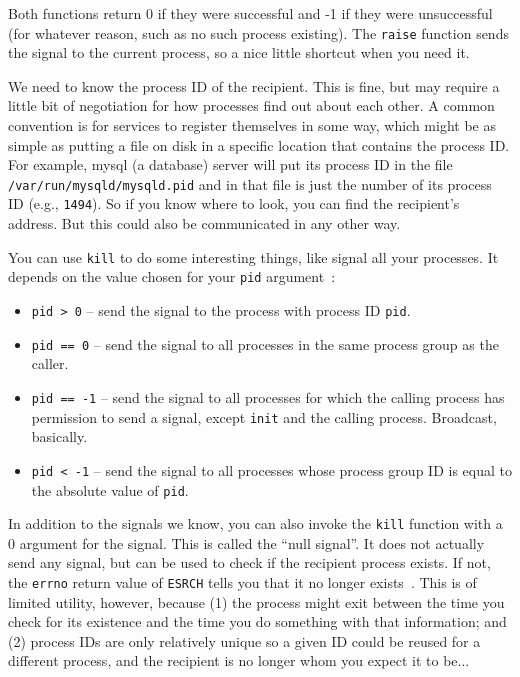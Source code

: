 Both functions return 0 if they were successful and -1 if they were unsuccessful (for whatever reason, such as no such process existing). The \texttt{raise} function sends the signal to the current process, so a nice little shortcut when you need it.

We need to know the process ID of the recipient. This is fine, but may require a little bit of negotiation for how processes find out about each other. A common convention is for services to register themselves in some way, which might be as simple as putting a file on disk in a specific location that contains the process ID. For example, mysql (a database) server will put its process ID in the file \texttt{/var/run/mysqld/mysqld.pid} and in that file is just the number of its process ID (e.g., \texttt{1494}). So if you know where to look, you can find the recipient's address. But this could also be communicated in any other way.

You can use \texttt{kill} to do some interesting things, like signal all your processes. It depends on the value chosen for your \texttt{pid} argument~\cite{apunix}:
\begin{itemize}
	\item \texttt{pid > 0} -- send the signal to the process with process ID \texttt{pid}.
	\item \texttt{pid == 0} -- send the signal to all processes in the same process group as the caller.
	\item \texttt{pid == -1} -- send the signal to all processes for which the calling process has permission to send a signal, except \texttt{init} and the calling process. Broadcast, basically.
	\item \texttt{pid < -1} -- send the signal to all processes whose process group ID is equal to the absolute value of \texttt{pid}.	
\end{itemize}

In addition to the signals we know, you can also invoke the \texttt{kill} function with a 0 argument for the signal. This is called the ``null signal''. It does not actually send any signal, but can be used to check if the recipient process exists. If not, the \texttt{errno} return value of \texttt{ESRCH} tells you that it no longer exists~\cite{apunix}. This is of limited utility, however, because (1) the process might exit between the time you check for its existence and the time you do something with that information; and (2) process IDs are only relatively unique so a given ID could be reused for a different process, and the recipient is no longer whom you expect it to be...

